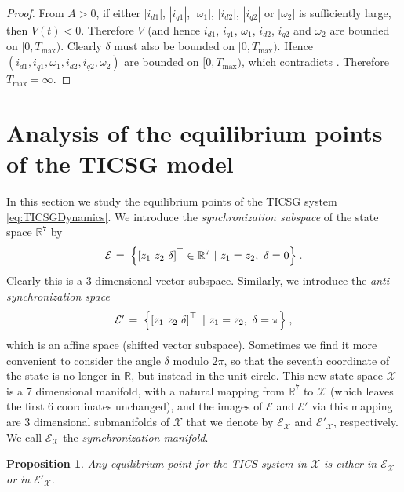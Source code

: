 \documentclass[letterpaper, 10 pt, conference]{ieeeconf}
\newtheorem{proposition}[theorem]{Proposition}
\newcommand{\rline}  {{\mathbb R}}
\renewcommand{\o}    {{\omega}}
\newcommand{\m}      {{\hbox{\hskip 1pt}}}
\newcommand{\Emscr}  {{\mathcal{E}}}
\newcommand{\Xmscr}  {{\mathcal{X}}}
\begin{document}
\begin{proof}
From $A>0$, if either $|i_{d1}|$, $|i_{q1}|$, $|\o_1|$, $|i_{d2}|$,
$|i_{q2}|$ or $|\o_2|$ is sufficiently large, then
$\dot{V}(t)<0$. Therefore $V$ (and hence $i_{d1}$, $i_{q1}$, $\o_1$,
$i_{d2}$, $i_{q2}$ and $\o_2$ are bounded on $[0,{T_{\max}})$. Clearly
$\delta$ must also be bounded on $[0,{T_{\max}})$. Hence $(i_{d1},
i_{q1},\o_1,i_{d2},i_{q2},\o_2)$ are bounded on $[0,{T_{\max}})$, which
contradicts \cite[Corollary II.3]{JayWeissBS:09}. Therefore 
${T_{\max}}=\infty$.
\end{proof}
 
\section{Analysis of the equilibrium points of the TICSG model} 
\label{sec4} %

In this section we study the equilibrium points of the TICSG
system \eqref{eq:TICSGDynamics}. We introduce the {\em synchronization 
subspace} of the state space $\rline^7$ by
\begin{equation} \label{eq:SyncSubspace}
   \Emscr \m=\m \left\{ \left[z_1 \ z_2 \ \delta \right]^\top\in
   \rline^7 \ |\ z_1=z_2,\ \delta = 0 \right\} \m.
\end{equation}
Clearly this is a 3-dimensional vector subspace. Similarly, we
introduce the {\em anti-synchronization space}
\begin{equation} \label{eq:AntiSyncSubspace}
   \Emscr' \m=\m \left\{ \left[z_1 \ z_2 \ \delta \right]^\top
   \ |\ z_1=z_2,\ \delta = \pi \right\} \m,
\end{equation}
which is an affine space (shifted vector subspace). Sometimes we find
it more convenient to consider the angle $\delta$ modulo $2\pi$, so
that the seventh coordinate of the state is no longer in $\rline$, but
instead in the unit circle. This new state space $\Xmscr$ is a 7
dimensional manifold, with a natural mapping from $\rline^7$ to
$\Xmscr$ (which leaves the first 6 coordinates unchanged), and the
images of $\Emscr$ and $\Emscr'$ via this mapping are 3 dimensional
submanifolds of $\Xmscr$ that we denote by $\Emscr_\Xmscr$ and
$\Emscr'_\Xmscr$, respectively. We call $\Emscr_\Xmscr$ the 
{\em symchronization manifold}.

\begin{proposition} \label{EqPointsProp1}
Any equilibrium point for the TICS system in $\Xmscr$ is either in
$\Emscr_\Xmscr$ or in $\Emscr'_\Xmscr$.
\end{proposition}
\end{document}
